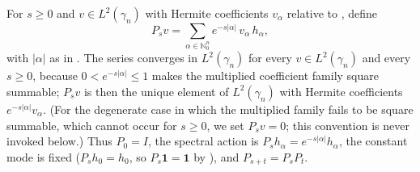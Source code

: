 \begin{definition}
For $s \geq 0$ and $v \in L^2(\gamma_n)$ with Hermite coefficients $v_\alpha$
relative to , define
\[
  P_s v = \sum_{\alpha \in \mathbb{N}_0^n} e^{-s|\alpha|}\, v_\alpha\, h_\alpha ,
\]
with $|\alpha|$ as in .  The series converges in
$L^2(\gamma_n)$ for every $v \in L^2(\gamma_n)$ and every $s \geq 0$, because
$0 < e^{-s|\alpha|} \leq 1$ makes the multiplied coefficient family square
summable; $P_s v$ is then the unique element of $L^2(\gamma_n)$ with Hermite
coefficients $e^{-s|\alpha|}v_\alpha$.  (For the degenerate case in which the
multiplied family fails to be square summable, which cannot occur for $s\geq0$,
we set $P_s v = 0$; this convention is never invoked below.)  Thus $P_0 = I$, the
spectral action is $P_s h_\alpha = e^{-s|\alpha|} h_\alpha$, the constant mode is
fixed ($P_s h_0 = h_0$, so $P_s \mathbf{1} = \mathbf{1}$ by
), and $P_{s+t} = P_s P_t$.
\end{definition}

